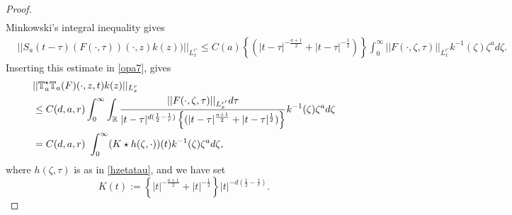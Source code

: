 \documentclass[11pt,letter]{amsart}
\def \R {\mathbb{R}}
\numberwithin{equation}{section}
\numberwithin{equation}{section}
\begin{document}
\begin{proof}
\begin{align*}
\end{align*}
Minkowski's integral inequality gives
\begin{align*}
& ||S_a(t-\tau)(F(\cdot,\tau))(\cdot,z) k(z))||_{L^{r'}_x} \le C(a)\left\{(|t-\tau|^{-\frac{a+1}2} + |t-\tau|^{-\frac{1}2})\right\} \int_0^\infty ||F(\cdot,\zeta,\tau)||_{L^{r'}_x} k^{-1}(\zeta) \zeta^a d\zeta.
\end{align*}
Inserting this estimate in \eqref{opa7}, gives
\begin{align}\label{opa7bis}
& ||\mathbb T_a^\star \mathbb T_a(F)(\cdot,z,t) k(z)||_{L^r_x}
\\
& \le C(d,a,r) \int_0^\infty  \int_\R \frac{||F(\cdot,\zeta,\tau)||_{L^{r'}_x} d\tau}{|t-\tau|^{d(\frac 12 - \frac 1r)}\left\{(|t-\tau|^{\frac{a+1}2} + |t-\tau|^{\frac{1}2})\right\}} k^{-1}(\zeta) \zeta^a d\zeta
\notag\\
& = C(d,a,r)\ \int_0^\infty (K\star h(\zeta,\cdot))(t) k^{-1}(\zeta) \zeta^a d\zeta,
\notag
\end{align}
where $h(\zeta,\tau)$ is as in \eqref{hzetatau}, and we have set
\begin{equation}\label{K}
K(t) := \left\{|t|^{-\frac{a+1}2} + |t|^{-\frac{1}2}\right\} |t|^{-d(\frac 12 - \frac 1r)}.
\end{equation}




\end{proof}
\end{document}
